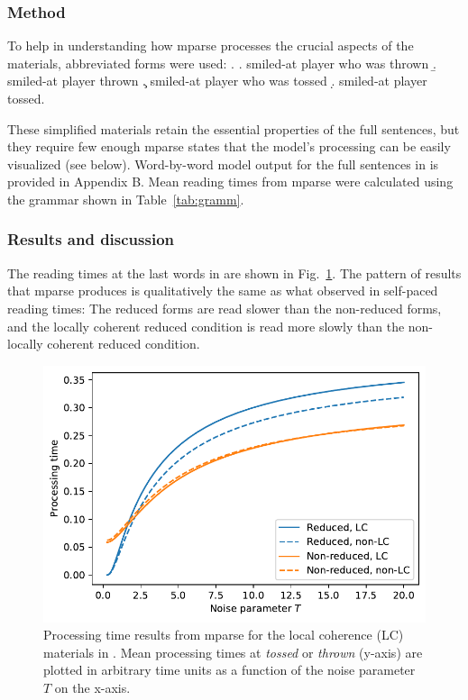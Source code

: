\documentclass[a4paper, 12pt]{article}
\begin{document}
\subsubsection{Method}
To help in understanding how mparse processes the
crucial aspects of the materials, abbreviated forms were used: \ex. \a.
smiled-at player who was thrown \b. smiled-at player thrown \c. smiled-at
player who was tossed \d. smiled-at player tossed.

These simplified materials retain the essential properties of the full
sentences, but they require few enough mparse states that the model's
processing can be easily visualized (see below). Word-by-word model output for
the full sentences in \LLast is provided in Appendix B. Mean reading times from
mparse were calculated using the grammar shown in Table~\ref{tab:gramm}. 

\subsubsection{Results and discussion}
The reading times at the last words in \Last are shown in
Fig.~\ref{fig:lcresults}. The pattern of results that mparse produces
is qualitatively the same as what \citet{tabor2004effects} observed in
self-paced reading times: The reduced forms are read slower than the
non-reduced forms, and the locally coherent reduced condition is read more
slowly than the non-locally coherent reduced condition.




\begin{figure}[htbp]

\includegraphics[width= \linewidth]{figures/mparse_intro_lcnoisefig_1.pdf}

\caption{Processing time results from mparse for the local coherence (LC) materials
    in \protect\Last. Mean processing times at \emph{tossed} or \emph{thrown} (y-axis) are
    plotted in arbitrary time units as a function of the noise parameter $T$ on
    the x-axis.}\label{fig:lcresults}
\end{figure}
\end{document}

